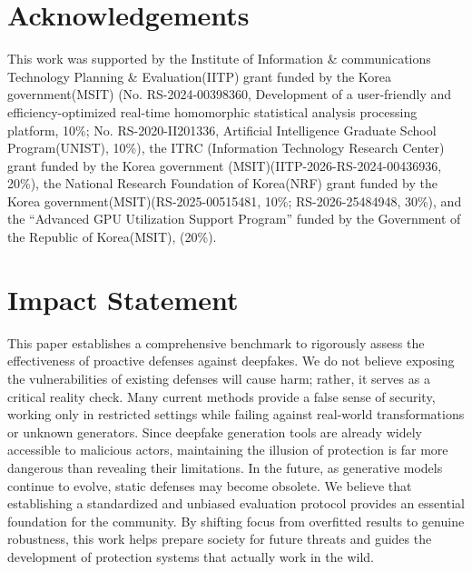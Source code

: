 \documentclass{article}
\begin{document}

\section*{Acknowledgements}
This work was supported by the Institute of Information \& communications Technology Planning \& Evaluation(IITP) grant funded by the Korea government(MSIT) (No. RS-2024-00398360, Development of a user-friendly and efficiency-optimized real-time homomorphic statistical analysis processing platform, 10\%; No. RS-2020-II201336, Artificial Intelligence Graduate School Program(UNIST), 10\%), the ITRC (Information Technology Research Center) grant funded by the Korea government (MSIT)(IITP-2026-RS-2024-00436936, 20\%), the National Research Foundation of Korea(NRF) grant funded by the Korea government(MSIT)(RS-2025-00515481, 10\%; RS-2026-25484948, 30\%), and the “Advanced GPU Utilization Support Program” funded by the Government of the Republic of Korea(MSIT), (20\%).

\section*{Impact Statement}
This paper establishes a comprehensive benchmark to rigorously assess the effectiveness of proactive defenses against deepfakes. We do not believe exposing the vulnerabilities of existing defenses will cause harm; rather, it serves as a critical reality check. Many current methods provide a false sense of security, working only in restricted settings while failing against real-world transformations or unknown generators. Since deepfake generation tools are already widely accessible to malicious actors, maintaining the illusion of protection is far more dangerous than revealing their limitations. In the future, as generative models continue to evolve, static defenses may become obsolete. We believe that establishing a standardized and unbiased evaluation protocol provides an essential foundation for the community. By shifting focus from overfitted results to genuine robustness, this work helps prepare society for future threats and guides the development of protection systems that actually work in the wild.
\end{document}
